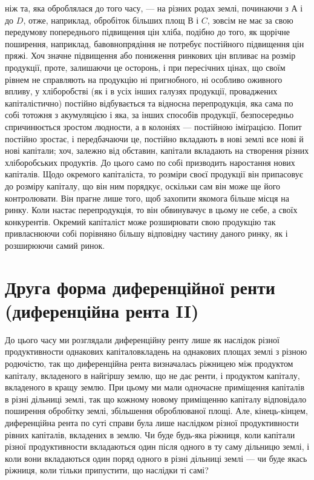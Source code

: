 \parcont{}  %
ніж та, яка оброблялася до того часу, — на різних родах землі, починаючи з $А$
і до $D$, отже, наприклад, обробіток більших площ $В$ і $C$, зовсім не має за свою передумову
попереднього підвищення цін хліба, подібно до того, як щорічне поширення,
наприклад, бавовнопрядіння не потребує постійного підвищення цін пряжі. Хоч
значне підвищення або пониження ринкових цін впливає на розмір продукції,
проте, залишаючи це осторонь, і при пересічних цінах, що своїм рівнем не справляють
на продукцію ні пригнобного, ні особливо оживного впливу, у хліборобстві
(як і в усіх інших галузях продукції, проваджених капіталістично) постійно
відбувається та відносна перепродукція, яка сама по собі тотожня з
акумуляцією і яка, за інших способів продукції, безпосередньо спричинюється
зростом людности, а в колоніях — постійною іміґрацією. Попит постійно зростає,
і передбачаючи це, постійно вкладають в нові землі все нові й нові капітали;
хоч, залежно від обставин, капітали вкладають на створення різних хліборобських
продуктів. До цього само по собі призводить наростання нових капіталів.
Щодо окремого капіталіста, то розміри своєї продукції він припасовує до розміру
капіталу, що він ним порядкує, оскільки сам він може ще його контролювати.
Він прагне лише того, щоб захопити якомога більше місця на ринку.
Коли настає перепродукція, то він обвинувачує в цьому не себе, а своїх конкурентів.
Окремий капіталіст може розширювати свою продукцію так привласнюючи
собі порівняно більшу відповідну частину даного ринку, як і розширюючи самий
ринок.

\section{Друга форма диференційної ренти (диференційна рента II)}

До цього часу ми розглядали диференційну ренту лише як наслідок різної
продуктивности однакових капіталовкладень на однакових площах землі з різною
родючістю, так що диференційна рента визначалась ріжницею між продуктом
капіталу, вкладеного в найгіршу землю, що не дає ренти, і продуктом капіталу,
вкладеного в кращу землю. При цьому ми мали одночасне приміщення капіталів
в різні дільниці землі, так що кожному новому приміщенню капіталу відповідало
поширення обробітку землі, збільшення оброблюваної площі. Але, кінець-кінцем,
диференційна рента по суті справи була лише наслідком різної
продуктивности рівних капіталів, вкладених в землю. Чи буде будь-яка ріжниця,
коли капітали різної продуктивности вкладаються один після одного в ту
саму дільницю землі, і коли вони вкладаються один поряд одного в різні дільниці
землі — чи буде якась ріжниця, коли тільки припустити, що наслідки ті самі?

